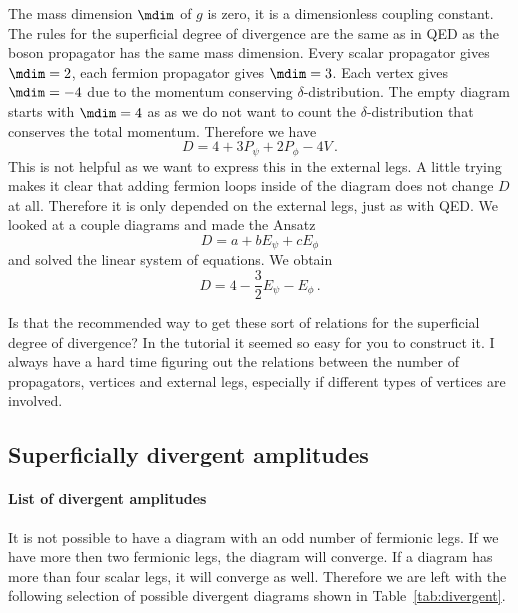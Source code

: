 \documentclass[11pt, english, fleqn, DIV=15, headinclude]{scrartcl}
\begin{document}
The mass dimension $\mdim$ of $g$ is zero, it is a dimensionless coupling
constant. The rules for the superficial degree of divergence are the same as in
QED as the boson propagator has the same mass dimension. Every scalar
propagator gives $\mdim = 2$, each fermion propagator gives $\mdim = 3$. Each
vertex gives $\mdim = -4$ due to the momentum conserving $\delta$-distribution.
The empty diagram starts with $\mdim = 4$ as as we do not want to count the
$\delta$-distribution that conserves the total momentum. Therefore we have
\[
    D = 4 + 3 P_\psi + 2 P_\phi - 4 V \,.
\]
This is not helpful as we want to express this in the external legs. A little
trying makes it clear that adding fermion loops inside of the diagram does not
change $D$ at all. Therefore it is only depended on the external legs, just as
with QED\@. We looked at a couple diagrams and made the Ansatz
\[
    D = a + b E_\psi + c E_\phi
\]
and solved the linear system of equations. We obtain
\[
    D = 4 - \frac32 E_\psi - E_\phi \,.
\]

\begin{question}
    Is that the recommended way to get these sort of relations for the
    superficial degree of divergence? In the tutorial it seemed so easy for you
    to construct it. I always have a hard time figuring out the relations
    between the number of propagators, vertices and external legs, especially
    if different types of vertices are involved.
\end{question}

\subsection{Superficially divergent amplitudes}

\paragraph{List of divergent amplitudes}

It is not possible to have a diagram with an odd number of fermionic legs. If
we have more then two fermionic legs, the diagram will converge. If a diagram
has more than four scalar legs, it will converge as well. Therefore we are left
with the following selection of possible divergent diagrams shown in
Table~\ref{tab:divergent}.
\end{document}
